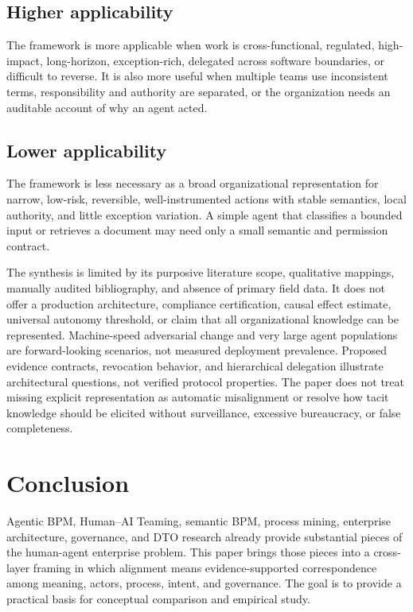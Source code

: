 \documentclass[11pt,letterpaper]{article}
\begin{document}
\subsection{Higher applicability}
The framework is more applicable when work is cross-functional, regulated, high-impact, long-horizon, exception-rich, delegated across software boundaries, or difficult to reverse. It is also more useful when multiple teams use inconsistent terms, responsibility and authority are separated, or the organization needs an auditable account of why an agent acted.

\subsection{Lower applicability}
The framework is less necessary as a broad organizational representation for narrow, low-risk, reversible, well-instrumented actions with stable semantics, local authority, and little exception variation. A simple agent that classifies a bounded input or retrieves a document may need only a small semantic and permission contract.

The synthesis is limited by its purposive literature scope, qualitative mappings, manually audited bibliography, and absence of primary field data. It does not offer a production architecture, compliance certification, causal effect estimate, universal autonomy threshold, or claim that all organizational knowledge can be represented. Machine-speed adversarial change and very large agent populations are forward-looking scenarios, not measured deployment prevalence. Proposed evidence contracts, revocation behavior, and hierarchical delegation illustrate architectural questions, not verified protocol properties. The paper does not treat missing explicit representation as automatic misalignment or resolve how tacit knowledge should be elicited without surveillance, excessive bureaucracy, or false completeness.

\section{Conclusion}
Agentic BPM, Human--AI Teaming, semantic BPM, process mining, enterprise architecture, governance, and DTO research already provide substantial pieces of the human-agent enterprise problem. This paper brings those pieces into a cross-layer framing in which alignment means evidence-supported correspondence among meaning, actors, process, intent, and governance. The goal is to provide a practical basis for conceptual comparison and empirical study.
\end{document}
